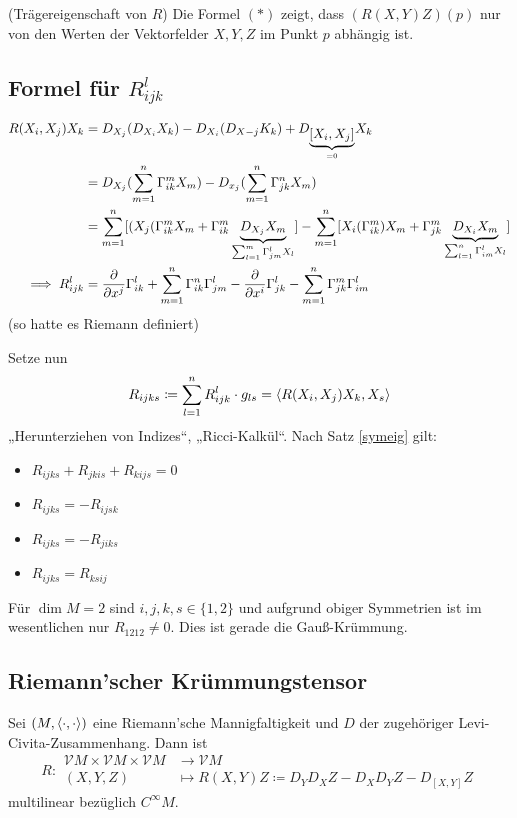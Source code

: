 \documentclass[a4paper,twoside,DIV15,BCOR12mm]{scrbook}
\renewcommand{\da}{\coloneqq}
\newcommand{\V}{\mathcal V}
\begin{document}
\begin{bemerkung} (Trägereigenschaft von $R$)
Die Formel $(*)$ zeigt, dass $(R(X,Y)Z)(p)$ nur von den Werten der Vektorfelder $X,Y,Z$ im Punkt $p$ abhängig ist.
\end{bemerkung}

\subsection*{Formel für $R_{ijk}^l$}
\begin{align*}
R(X_i,X_j)X_k &= D_{X_j}(D_{X_i}X_k) - D_{X_i}(D_{X-j}K_k) + D_{\underbrace{[X_i,X_j]}_{=0}}X_k \\
&=  D_{X_j}(\sum_{m=1}^n \Gamma_{ik}^m X_m) - D_{x_j}(\sum_{m=1}^n \Gamma_{jk}^n X_m) \\
&= \sum_{m=1}^n [ (X_j (\Gamma_{ik}^m X_m + \Gamma_{ik}^m \underbrace{D_{X_j}X_m}_{\sum_{l=1}^m \Gamma_{jm}^l X_l} ] - \sum_{m=1}^n [X_i (\Gamma_{ik}^m) X_m + \Gamma_{jk}^m \underbrace{D_{X_i}X_m}_{\sum_{l=1}^n \Gamma_{im}^l X_l } ] \\
\implies R_{ijk}^l &= \frac{\partial}{\partial x^j} \Gamma_{ik}^l + \sum_{m=1}^n \Gamma_{ik}^n \Gamma_{jm}^l - \frac{\partial}{\partial x^i} \Gamma_{jk}^l - \sum_{m=1}^n \Gamma_{jk}^m \Gamma_{im}^l
\end{align*}
(so hatte es Riemann definiert)

Setze nun
\[
R_{ijks} \da \sum_{l=1}^n R_{ijk}^l \cdot g_{ls} = \ksp {R(X_i,X_j)X_k} {X_s}
\]
„Herunterziehen von Indizes“, „Ricci-Kalkül“. Nach Satz \ref{symeig} gilt:
\begin{itemize}
\item $R_{ijks} + R_{jkis} + R_{kijs} = 0$
\item $R_{ijks} = -R_{ijsk}$
\item $R_{ijks} = -R_{jiks}$
\item $R_{ijks} = R_{ksij}$
\end{itemize}

\begin{bemerkung}
Für $\dim M=2$ sind $i,j,k,s \in \{1,2\}$ und aufgrund obiger Symmetrien ist im wesentlichen nur $R_{1212} \ne 0$. Dies ist gerade die Gauß-Krümmung.
\end{bemerkung}


\subsection*{Riemann’scher Krümmungstensor}

Sei $(M,\langle\cdot,\cdot\rangle)$ eine Riemann’sche Mannigfaltigkeit und $D$ der zugehöriger Levi-Civita-Zusammenhang. Dann ist
\[
R:
\begin{aligned}
\V M \times \V M \times \V M  &\to \V M \\
(X,Y,Z) &\mapsto R(X,Y)Z \da D_YD_XZ - D_XD_YZ - D_{[X,Y]}Z
\end{aligned}
\]
multilinear bezüglich $C^\infty M$.
\end{document}
